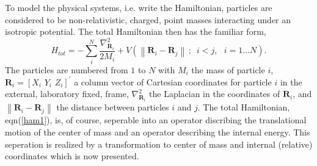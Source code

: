 \documentclass[12pt,thmsa]{article}
\begin{document}
To model the physical systems, i.e. write the Hamiltonian, particles are
considered to be non-relativistic, charged, point masses interacting under
an isotropic potential. The total Hamiltonian then has the familiar form, 
\begin{equation}
H_{tot}=-\sum_i^N\frac{\nabla _{\mathbf{R}_i}^2}{2M_i}+V\left( \left\| 
\mathbf{R}_i-\mathbf{R}_j\right\| \,;\,\,\,i<j,\,\,\,\,i=1...N\right) .
\label{ham1}
\end{equation}
The particles are numbered from $1$ to $N$ with $M_i$ the mass of particle $%
i $, $\mathbf{R}_i=[X_i\,\,Y_i\,\,Z_i]^{\prime }$ a column vector of
Cartesian coordinates for particle $i$ in the external, laboratory fixed,
frame, $\nabla _{\mathbf{R}_i}^2$ the Laplacian in the coordinates of $%
\mathbf{R}_i$, and $\left\| \mathbf{R}_i-\mathbf{R}_j\right\| $ the distance
between particles $i$ and $j$. The total Hamiltonian, eqn(\ref{ham1}), is,
of course, seperable into an operator discribing the translational motion of
the center of mass and an operator describing the internal energy. This
seperation is realized by a transformation to center of mass and internal
(relative) coordinates which is now presented.
\end{document}
